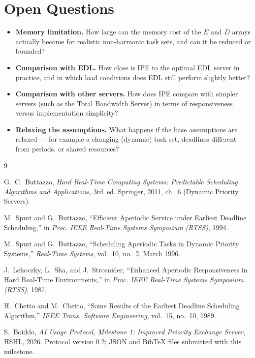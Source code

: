\documentclass[conference]{IEEEtran}
\begin{document}
\section{Open Questions}

\begin{itemize}
  \item \textbf{Memory limitation.} How large can the memory cost of the $E$
        and $D$ arrays actually become for realistic non-harmonic task sets,
        and can it be reduced or bounded?
  \item \textbf{Comparison with EDL.} How close is IPE to the optimal EDL
        server in practice, and in which load conditions does EDL still perform
        slightly better?
  \item \textbf{Comparison with other servers.} How does IPE compare with
        simpler servers (such as the Total Bandwidth Server) in terms of
        responsiveness versus implementation simplicity?
  \item \textbf{Relaxing the assumptions.} What happens if the base assumptions
        are relaxed --- for example a changing (dynamic) task set, deadlines
        different from periods, or shared resources?
\end{itemize}


\begin{thebibliography}{9}

G.~C.~Buttazzo,
\textit{Hard Real-Time Computing Systems: Predictable Scheduling Algorithms
and Applications}, 3rd~ed.
Springer, 2011, ch.~6 (Dynamic Priority Servers).

M.~Spuri and G.~Buttazzo,
``Efficient Aperiodic Service under Earliest Deadline Scheduling,''
in \textit{Proc. IEEE Real-Time Systems Symposium (RTSS)}, 1994.

M.~Spuri and G.~Buttazzo,
``Scheduling Aperiodic Tasks in Dynamic Priority Systems,''
\textit{Real-Time Systems}, vol.~10, no.~2, March 1996.

J.~Lehoczky, L.~Sha, and J.~Strosnider,
``Enhanced Aperiodic Responsiveness in Hard Real-Time Environments,''
in \textit{Proc. IEEE Real-Time Systems Symposium (RTSS)}, 1987.

H.~Chetto and M.~Chetto,
``Some Results of the Earliest Deadline Scheduling Algorithm,''
\textit{IEEE Trans. Software Engineering}, vol.~15, no.~10, 1989.

S.~Boiddo,
\textit{AI Usage Protocol, Milestone 1: Improved Priority Exchange Server},
HSHL, 2026. Protocol version 0.2; JSON and BibTeX files submitted with this
milestone.

\end{thebibliography}
\end{document}

